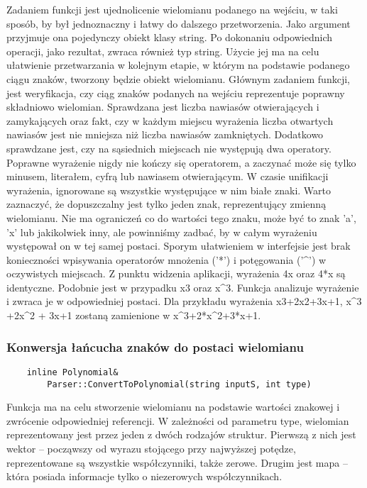 \documentclass[oneside,a4paper]{book}
\begin{document}
	Zadaniem funkcji jest ujednolicenie wielomianu podanego na wejściu, w taki sposób, by był jednoznaczny i łatwy do dalszego przetworzenia. Jako argument przyjmuje ona pojedynczy obiekt klasy string. Po dokonaniu odpowiednich operacji, jako rezultat, zwraca również typ string. Użycie jej ma na celu ułatwienie przetwarzania w kolejnym etapie, w którym na podstawie podanego ciągu znaków, tworzony będzie obiekt wielomianu. Głównym zadaniem funkcji, jest weryfikacja, czy ciąg znaków podanych na wejściu reprezentuje poprawny składniowo wielomian. Sprawdzana jest liczba nawiasów otwierających i zamykających oraz fakt, czy w każdym miejscu wyrażenia liczba otwartych nawiasów jest nie mniejsza niż liczba nawiasów zamkniętych. Dodatkowo sprawdzane jest, czy na sąsiednich miejscach nie występują dwa operatory. Poprawne wyrażenie nigdy nie kończy się operatorem, a zaczynać może się tylko minusem, literałem, cyfrą lub nawiasem otwierającym. W czasie unifikacji wyrażenia, ignorowane są wszystkie występujące w nim białe znaki. Warto zaznaczyć, że dopuszczalny jest tylko jeden znak, reprezentujący zmienną wielomianu. Nie ma ograniczeń co do wartości tego znaku, może być to znak 'a', 'x' lub jakikolwiek inny, ale powinniśmy zadbać, by w całym wyrażeniu występował on w tej samej postaci. Sporym ułatwieniem w interfejsie jest brak konieczności wpisywania operatorów mnożenia ('*') i potęgowania ('\^{}') w oczywistych miejscach. Z punktu widzenia aplikacji, wyrażenia 4x oraz 4*x są identyczne. Podobnie jest w przypadku x3 oraz x\^{}3. Funkcja analizuje wyrażenie i zwraca je w odpowiedniej postaci. Dla przykładu wyrażenia x3+2x2+3x+1, x\^{}3 +2x\^{}2 + 3x+1 zostaną zamienione w x\^{}3+2*x\^{}2+3*x+1.
	
	\subsubsection{Konwersja łańcucha znaków do postaci wielomianu}
	\begin{lstlisting}
	inline Polynomial&
	    Parser::ConvertToPolynomial(string inputS, int type)
	\end{lstlisting}
	
	Funkcja ma na celu stworzenie wielomianu na podstawie wartości znakowej i zwrócenie odpowiedniej referencji. W zależności od parametru type, wielomian reprezentowany jest przez jeden z dwóch rodzajów struktur. Pierwszą z nich jest wektor -- począwszy od wyrazu stojącego przy najwyższej potędze, reprezentowane są wszystkie współczynniki, także zerowe. Drugim jest mapa -- która posiada informacje tylko o niezerowych współczynnikach.
	
\end{document}
